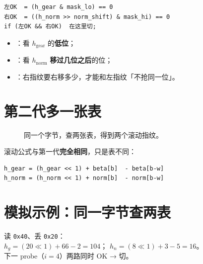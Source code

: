 \begin{codebox}
\begin{lstlisting}
左OK  = (h_gear & mask_lo) == 0
右OK  = ((h_norm >> norm_shift) & mask_hi) == 0
if (左OK && 右OK)  在这里切;
\end{lstlisting}
\end{codebox}

\begin{beginnerbox}[三个新名词]
\begin{itemize}[nosep]
  \item {}：看 $h_{\mathrm{gear}}$ 的\textbf{低位}；
  \item {}：看 $h_{\mathrm{norm}}$ \textbf{移过几位之后}的位；
  \item {}：右指纹要右移多少，才能和左指纹「不抢同一位」。
\end{itemize}
\end{beginnerbox}

\section{第二代多一张表}

\begin{figure}[htbp]
\centering
{}
\caption{同一个字节，查两张表，得到两个滚动指纹。}
\end{figure}

滚动公式与第一代\textbf{完全相同}，只是表不同：

\begin{lstlisting}
h_gear = (h_gear << 1) + beta[b]  - beta[b-w]
h_norm = (h_norm << 1) + norm[b]  - norm[b-w]
\end{lstlisting}

\section{模拟示例：同一字节查两表}

\begin{simbox}[$i=3$ 滚动后（未切），为 $i=4$ 准备]
读 \texttt{0x40}、丢 \texttt{0x20}：\\
$h_g = (20 \ll 1) + 66 - 2 = 104$；\quad
$h_n = (8 \ll 1) + 3 - 5 = 16$。\\
下一 probe（$i=4$）两路同时 OK → 切。
\end{simbox}
